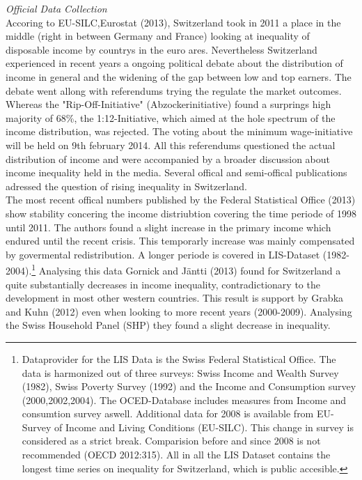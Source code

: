 \documentclass[twoside]{article}\usepackage[]{graphicx}\usepackage[]{color}
\begin{document}
\begin{multicols}{2}

\emph{Official Data Collection} \\

Accoring to EU-SILC,Eurostat (2013), Switzerland took in 2011 a place in the middle (right in between Germany and France) looking at inequality of disposable income by countrys in the euro ares. Nevertheless Switzerland experienced in recent years a ongoing political debate about the distribution of income in general and the widening of the gap between low and top earners. The debate went allong with referendums trying the regulate the market outcomes. Whereas the "Rip-Off-Initiative" (Abzockerinitiative) found a surprings high majority of 68\%, the 1:12-Initiative, which aimed at the hole spectrum of the income distribution, was rejected. The voting about the minimum wage-initiative will be held on 9th february 2014. All this referendums questioned the actual distribution of income and were accompanied by a broader discussion about income inequality held in the media. Several offical and semi-offical publications adressed the question of rising inequality in Switzerland. \\

The most recent offical numbers published by the Federal Statistical Office (2013) show  stability concering the income distriubtion covering the time periode of 1998 until 2011. The authors found a slight increase in the primary income which endured until the recent crisis. This temporarly increase was mainly compensated by govermental redistribution. A longer periode is covered in LIS-Dataset (1982-2004).\footnote{Dataprovider for the LIS Data is the Swiss Federal Statistical Office. The data is harmonized out of three surveys: Swiss Income and Wealth Survey (1982), Swiss Poverty Survey (1992) and the Income and Consumption survey (2000,2002,2004). The OCED-Database includes measures from Income and consumtion survey aswell. Additional data for 2008 is available from EU-Survey of Income and Living Conditions (EU-SILC). This change in survey is considered as a strict break. Comparision before and since 2008 is not recommended (OECD 2012:315). All in all the LIS Dataset contains the longest time series on inequality for Switzerland, which is public accesible.} Analysing this data Gornick and Jäntti (2013) found for Switzerland a quite substantially decreases in income inequality, contradictionary to the development in most other western countries. This result is support by Grabka and Kuhn (2012) even when looking to more recent years (2000-2009). Analysing the Swiss Household Panel (SHP) they found a slight decrease in inequality. \\


\end{multicols}
\end{document}
